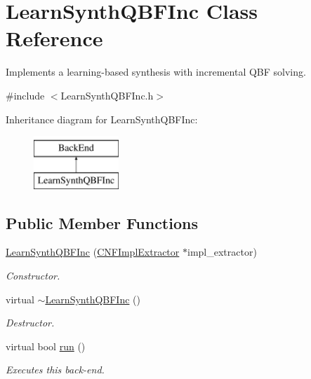 \hypertarget{classLearnSynthQBFInc}{\section{Learn\-Synth\-Q\-B\-F\-Inc Class Reference}
\label{classLearnSynthQBFInc}
}


Implements a learning-\/based synthesis with incremental Q\-B\-F solving.  




{\ttfamily \#include $<$Learn\-Synth\-Q\-B\-F\-Inc.\-h$>$}

Inheritance diagram for Learn\-Synth\-Q\-B\-F\-Inc\-:\begin{figure}[H]
\begin{center}
\leavevmode
\includegraphics[height=2.000000cm]{classLearnSynthQBFInc}
\end{center}
\end{figure}
\subsection*{Public Member Functions}
\begin{DoxyCompactItemize}
\item 
\hyperlink{classLearnSynthQBFInc_a0f339cf672d32893c0dbfc1d87611a1a}{Learn\-Synth\-Q\-B\-F\-Inc} (\hyperlink{classCNFImplExtractor}{C\-N\-F\-Impl\-Extractor} $\ast$impl\-\_\-extractor)
\begin{DoxyCompactList}\small\item\em Constructor. \end{DoxyCompactList}\item 
virtual \hyperlink{classLearnSynthQBFInc_a9d9e0b1d3aa1ea85da6884af34cdc003}{$\sim$\-Learn\-Synth\-Q\-B\-F\-Inc} ()
\begin{DoxyCompactList}\small\item\em Destructor. \end{DoxyCompactList}\item 
virtual bool \hyperlink{classLearnSynthQBFInc_af9563d1f3c657ed4730ee49e041bc300}{run} ()
\begin{DoxyCompactList}\small\item\em Executes this back-\/end. \end{DoxyCompactList}\end{DoxyCompactItemize}
